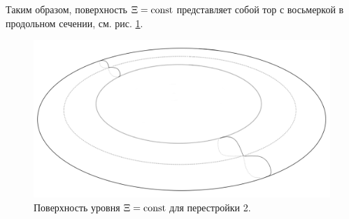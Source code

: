 Таким образом, поверхность $\Xi = \mathrm{const}$ представляет собой тор с восьмеркой в продольном сечении, см. рис. \ref{fig:pt9:_foc_ell_atom}.
\begin{figure}[!htb]
\centering
\includegraphics[scale=0.125]{images/ch4/section2/atoms/foc_ell_atom.pdf}
\caption{Поверхность уровня $\Xi = \mathrm{const}$ для перестройки 2.}
\label{fig:pt9:_foc_ell_atom}
\end{figure}

 
%

